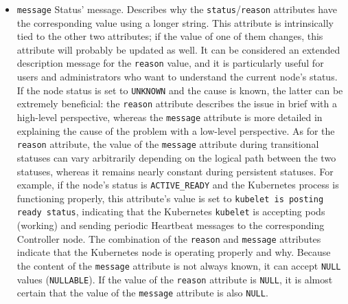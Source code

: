 \begin{itemize}
  \item \texttt{message}
    \newline
    Status' message.
    \newline
    Describes why the \texttt{status}/\texttt{reason} attributes have the
    corresponding value using a longer string. This attribute is intrinsically tied
    to the other two attributes; if the value of one of them changes, this attribute
    will probably be updated as well. It can be considered an extended
    description message for the \texttt{reason} value, and it is particularly
    useful for users and administrators who want to understand the current node's
    status. If the node status is set to \texttt{UNKNOWN} and the cause is known,
    the latter can be extremely beneficial: the \texttt{reason} attribute describes
    the issue in brief with a high-level perspective, whereas the \texttt{message}
    attribute is more detailed in explaining the cause of the problem with a low-level
    perspective. As for the \texttt{reason} attribute, the value of the \texttt{message}
    attribute during transitional statuses can vary arbitrarily depending on the
    logical path between the two statuses, whereas it remains nearly constant
    during persistent statuses.
    \newline
    For example, if the node's status is \texttt{ACTIVE\_READY} and the Kubernetes
    process is functioning properly, this attribute's value is set to \texttt{kubelet
    is posting ready status}, indicating that the Kubernetes \texttt{kubelet} is
    accepting pods (working) and sending periodic Heartbeat messages to the corresponding
    Controller node. The combination of the \texttt{reason} and \texttt{message}
    attributes indicate that the Kubernetes node is operating properly and why.
    \newline
    Because the content of the \texttt{message} attribute is not always known, it
    can accept \texttt{NULL} values (\texttt{NULLABLE}). If the value of the
    \texttt{reason} attribute is \texttt{NULL}, it is almost certain that the value
    of the \texttt{message} attribute is also \texttt{NULL}.


\end{itemize}
